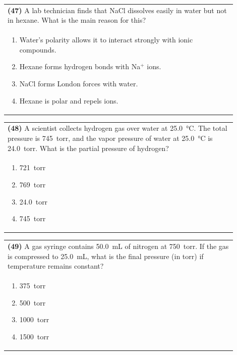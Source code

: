 \documentclass{article}
\begin{document}
{{\vspace{0.2cm}
\noindent\begin{tabular}{|p{0.9\linewidth}|}
\hline
\textbf{(47)} A lab technician finds that NaCl dissolves easily in water but not in hexane. What is the main reason for this?\\[0.2cm]
\begin{minipage}[t]{0.85\linewidth}
\begin{enumerate}[label=\alph*.]
\item Water's polarity allows it to interact strongly with ionic compounds.
\item Hexane forms hydrogen bonds with Na$^+$ ions.
\item NaCl forms London forces with water.
\item Hexane is polar and repels ions.
\end{enumerate}
\end{minipage}\\[0.2cm]
\hline
\end{tabular}

\vspace{0.2cm}
\noindent\begin{tabular}{|p{0.9\linewidth}|}
\hline
\textbf{(48)} A scientist collects hydrogen gas over water at 25.0~°C. The total pressure is 745~torr, and the vapor pressure of water at 25.0~°C is 24.0~torr. What is the partial pressure of hydrogen?\\[0.2cm]
\begin{minipage}[t]{0.85\linewidth}
\begin{enumerate}[label=\alph*.]
\item 721~torr
\item 769~torr
\item 24.0~torr
\item 745~torr
\end{enumerate}
\end{minipage}\\[0.2cm]
\hline
\end{tabular}
\newpage

\vspace{0.2cm}
\noindent\begin{tabular}{|p{0.9\linewidth}|}
\hline
\textbf{(49)} A gas syringe contains 50.0~mL of nitrogen at 750~torr. If the gas is compressed to 25.0~mL, what is the final pressure (in torr) if temperature remains constant?\\[0.2cm]
\begin{minipage}[t]{0.85\linewidth}
\begin{enumerate}[label=\alph*.]
\item 375~torr
\item 500~torr
\item 1000~torr
\item 1500~torr
\end{enumerate}
\end{minipage}\\[0.2cm]
\hline
\end{tabular}

}}
\end{document}

